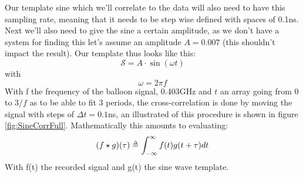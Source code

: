 Our template sine which we'll correlate to the data will also need to have this
sampling rate, meaning that it needs to be step wise defined with spaces of
0.1ns. Next we'll also need to give the sine a certain amplitude, as we don't
have a system for finding this let's assume an amplitude $A =0.007$ 
(this shouldn't impact the result).  Our template thus looks like this:
\begin{equation}
	\mathcal{S} = A\cdot\sin(\omega t) 
\end{equation}
with
\begin{equation}
	\omega = 2\pi f
\end{equation}
With f the frequency of the balloon signal, 0.403GHz and $t$ an array going
from 0 to $3/f$ as to be able to fit 3 periods, the
cross-correlation is done by moving the signal with steps of $\Delta t = 0.1$ns,
an illustrated of this procedure is shown in figure \ref{fig:SineCorrFull}. Mathematically this
amounts to evaluating\cite{Bracewell1966TheFT}:
\begin{equation}
  (f\star g)(\tau) \delequal \int_{-\infty}^\infty f(t)g(t+\tau)dt
\end{equation}
With f(t) the recorded signal and g(t) the sine wave template.

